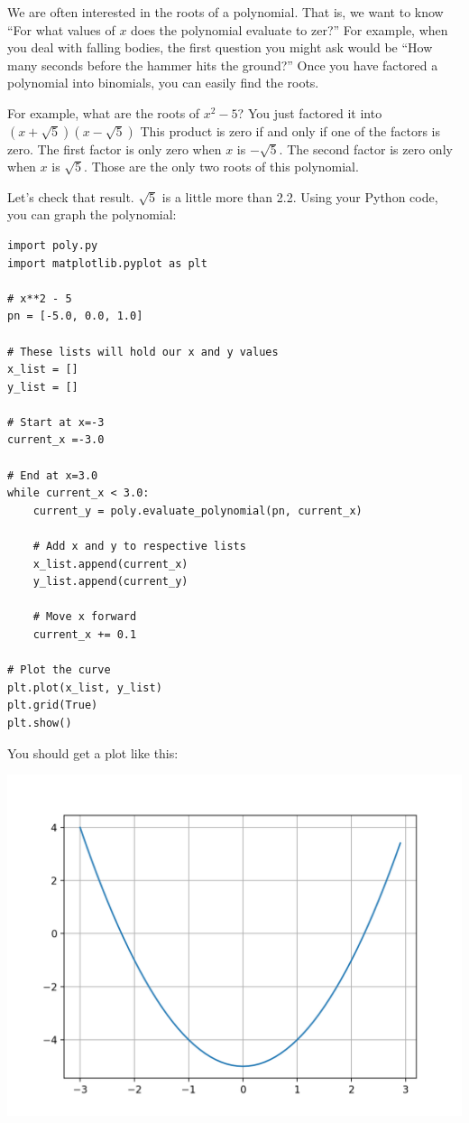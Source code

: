 We are often interested in the roots of a polynomial. That is, we want
to know ``For what values of $x$ does the polynomial evaluate to
zer?'' For example, when you deal with falling bodies, the first
question you might ask would be ``How many seconds before the hammer
hits the ground?''  Once you have factored a polynomial into
binomials, you can easily find the roots.

For example, what are the roots of $x^2 - 5$? You just factored it
into $(x + \sqrt{5})(x - \sqrt{5})$ This product is zero if and only
if one of the factors is zero. The first factor is only zero when $x$
is $-\sqrt{5}$. The second factor is zero only when $x$ is
$\sqrt{5}$. Those are the only two roots of this
polynomial.

Let's check that result. $\sqrt{5}$ is a little more than 2.2.  Using
your Python code, you can graph the polynomial:
\begin{Verbatim}
import poly.py
import matplotlib.pyplot as plt

# x**2 - 5
pn = [-5.0, 0.0, 1.0]

# These lists will hold our x and y values
x_list = []
y_list = []

# Start at x=-3
current_x =-3.0

# End at x=3.0
while current_x < 3.0:
    current_y = poly.evaluate_polynomial(pn, current_x)

    # Add x and y to respective lists
    x_list.append(current_x)
    y_list.append(current_y)

    # Move x forward
    current_x += 0.1

# Plot the curve
plt.plot(x_list, y_list)
plt.grid(True)
plt.show()
\end{Verbatim}

You should get a plot like this:

\includegraphics[width=\textwidth]{sqrt5.png}

